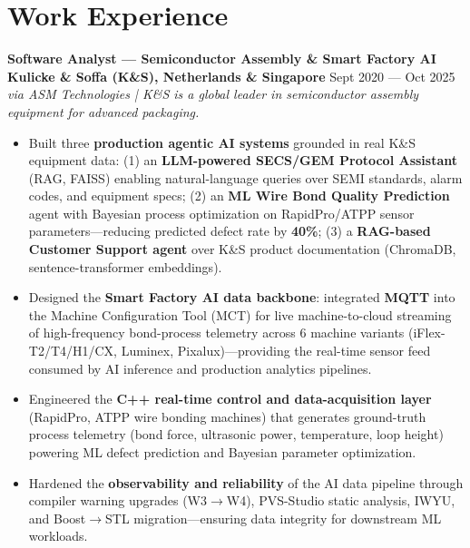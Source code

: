 \documentclass[11pt,a4paper]{article}
\newcommand{\jobtitle}[4]{%
    \noindent\textbf{#1}\\
    \textbf{#2} \hfill #3\\
    \textit{#4}\par\vspace{2pt}
}
\begin{document}
\section{Work Experience}

\jobtitle{Software Analyst --- Semiconductor Assembly \& Smart Factory AI}{Kulicke \& Soffa (K\&S), Netherlands \& Singapore}{Sept 2020 --- Oct 2025}{via ASM Technologies | K\&S is a global leader in semiconductor assembly equipment for advanced packaging.}
\begin{itemize}[leftmargin=*, nosep, topsep=2pt]
    \item Built three \textbf{production agentic AI systems} grounded in real K\&S equipment data: (1) an \textbf{LLM-powered SECS/GEM Protocol Assistant} (RAG, FAISS) enabling natural-language queries over SEMI standards, alarm codes, and equipment specs; (2) an \textbf{ML Wire Bond Quality Prediction} agent with Bayesian process optimization on RapidPro/ATPP sensor parameters---reducing predicted defect rate by \textbf{40\%}; (3) a \textbf{RAG-based Customer Support agent} over K\&S product documentation (ChromaDB, sentence-transformer embeddings).
    \item Designed the \textbf{Smart Factory AI data backbone}: integrated \textbf{MQTT} into the Machine Configuration Tool (MCT) for live machine-to-cloud streaming of high-frequency bond-process telemetry across 6 machine variants (iFlex-T2/T4/H1/CX, Luminex, Pixalux)---providing the real-time sensor feed consumed by AI inference and production analytics pipelines.
    \item Engineered the \textbf{C++ real-time control and data-acquisition layer} (RapidPro, ATPP wire bonding machines) that generates ground-truth process telemetry (bond force, ultrasonic power, temperature, loop height) powering ML defect prediction and Bayesian parameter optimization.
    \item Hardened the \textbf{observability and reliability} of the AI data pipeline through compiler warning upgrades (W3$\to$W4), PVS-Studio static analysis, IWYU, and Boost$\to$STL migration---ensuring data integrity for downstream ML workloads.
\end{itemize}
\end{document}
